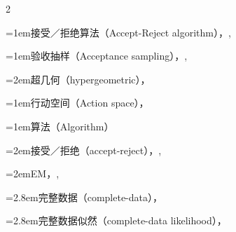 \begin{multicols}{2}
\par\addvspace{2pt}
\par\noindent\hangindent=1em\hspace*{0em}\label{idx:1}接受／拒绝算法（Accept-Reject algorithm），\hyperref[ex:5.6.7]{\pageref*{ex:5.6.7}}, \hyperref[thm:5.6.8]{\pageref*{thm:5.6.8}}\par
\par\addvspace{2pt}
\par\noindent\hangindent=1em\hspace*{0em}\label{idx:2}验收抽样（Acceptance sampling），\hyperref[idxocc:2:333]{\pageref*{idxocc:2:333}}, \hyperref[ex:8.2.9]{\pageref*{ex:8.2.9}}\par
\par\noindent\hangindent=2em\hspace*{1em}\label{idx:3}超几何（hypergeometric），\hyperref[ex:3.2.1]{\pageref*{ex:3.2.1}}\par
\par\addvspace{2pt}
\par\noindent\hangindent=1em\hspace*{0em}\label{idx:4}行动空间（Action space），\hyperref[idxocc:4:355]{\pageref*{idxocc:4:355}}\par
\par\addvspace{2pt}
\par\noindent\hangindent=1em\hspace*{0em}\label{idx:5}算法（Algorithm）\par
\par\noindent\hangindent=2em\hspace*{1em}\label{idx:6}接受／拒绝（accept-reject），\hyperref[ex:5.6.7]{\pageref*{ex:5.6.7}}, \hyperref[thm:5.6.8]{\pageref*{thm:5.6.8}}\par
\par\noindent\hangindent=2em\hspace*{1em}\label{idx:7}EM，\hyperref[sec:7.2.4]{\pageref*{sec:7.2.4}}, \hyperref[sec:7.5.4]{\pageref*{sec:7.5.4}}\par
\par\noindent\hangindent=2.8em\hspace*{1.8em}\label{idx:8}完整数据（complete-data），\hyperref[idxocc:8:295]{\pageref*{idxocc:8:295}}\par
\par\noindent\hangindent=2.8em\hspace*{1.8em}\label{idx:9}完整数据似然（complete-data likelihood），\hyperref[eq:7.2.11]{\pageref*{eq:7.2.11}}\par

\end{multicols}
